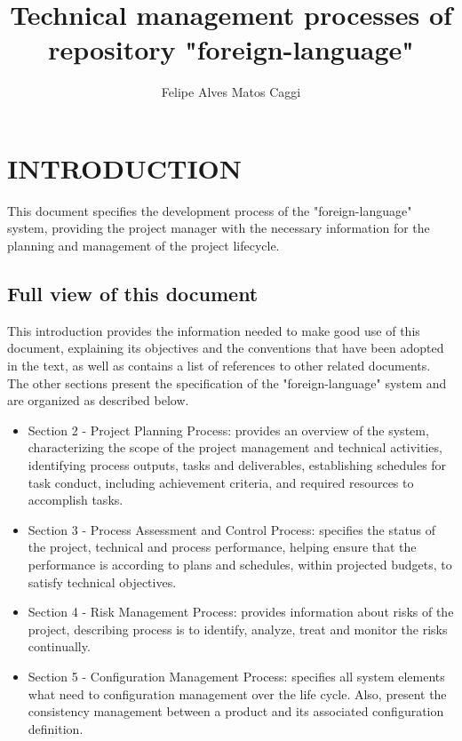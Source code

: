 \documentclass[11pt, twoside, a4paper]{book}
\begin{document}
    
        \title{Technical management processes of repository "foreign-language"}
        \author{Felipe Alves Matos Caggi}
        \maketitle
        
        \tableofcontents
        \newpage
        
        \chapter{INTRODUCTION}
        	
        	This document specifies the development process of the "foreign-language" system, providing the project manager with the necessary information for the planning and management of the project lifecycle.

            
            \section{Full view of this document}
            
                This introduction provides the information needed to make good use of this document, explaining its objectives and the conventions that have been adopted in the text, as well as contains a list of references to other related documents. The other sections present the specification of the "foreign-language" system and are organized as described below.
                
                \begin{itemize}
                
                    \item Section 2 - Project Planning Process: provides an overview of the system, characterizing the scope of the project management and technical activities, identifying process outputs, tasks and deliverables, establishing schedules for task conduct, including achievement criteria, and required resources	 to	accomplish tasks.
                    
                    \item Section 3 - Process Assessment and Control Process: specifies the status of the project, technical and process performance, helping ensure that the performance is according to plans and schedules, within projected budgets, to satisfy technical objectives.
                                        
                    \item Section 4 - Risk Management Process: provides information about risks of the project, describing process is to identify, analyze, treat and	monitor	the	risks continually.

                    \item Section 5 - Configuration Management Process: specifies all system elements what need to configuration management over the life cycle. Also, present the consistency management between a product and its associated configuration definition.
                    
                \end{itemize}						
                
\end{document}
